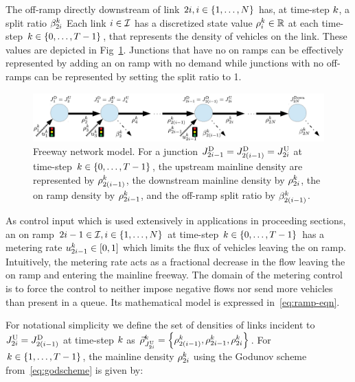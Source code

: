 The off-ramp directly downstream of link $2\link,i\in\intrange 1{\nlinks}$
has, at time-step $k$, a split ratio $\beta_{2i}^{k}$
Each link $i\in\mathcal{I}$ has a discretized state value $\rho_{i}^{k}\in\mathbb{R}$
at each time-step $\tind\in\intrange 0{\ntime-1}$, that represents
the density of vehicles on the link. These values are depicted in
Fig~\ref{fig:Freeway-network-junction}. Junctions that have no
on ramps can be effectively represented by adding an on ramp with no
demand while junctions with no off-ramps can be represented by setting
the split ratio to 1.
\begin{figure}
\centering
\includegraphics[width=1\columnwidth]{previous-articles/adjoint/figs-gen/rm-junction-2}
\caption{Freeway network model. For a junction $\jdown{2\link-1}=\jdown{2\left(\link-1\right)}=\jup{2\link}$
at time-step $\tind\in\intrange 0{\ntime-1}$, the upstream mainline
density are represented by $\densitydiscrete{2\left(\link-1\right)}{\tind}$,
the downstream mainline density by $\rho_{2i}^{k}$,
the on ramp density by $\rho_{2i-1}^{k}$, and the
off-ramp split ratio by $\splitratio_{2\left(\link-1\right)}^{\tind}$.}
\label{fig:Freeway-network-junction}
\end{figure}

As control input which is used extensively in applications in proceeding sections, an on ramp $2\link-1\in\links,\link\in\intrange 1{\nlinks}$
at time-step $k\in\intrange 0{\ntime-1}$ has a metering rate $\ramp_{2\link-1}^{\tind}\in\left[0,1\right]$
which limits the flux of vehicles leaving the on ramp. Intuitively,
the metering rate acts as a fractional decrease in the flow leaving
the on ramp and entering the mainline freeway. The domain of the metering
control is to force the control to neither impose negative flows nor
send more vehicles than present in a queue. Its mathematical model
is expressed in~\eqref{eq:ramp-eqn}.

For notational simplicity we define the set of densities of links
incident to $\jup{2\link}=\jdown{2\left(\link-1\right)}$ at time-step
$k$ as $\juncstate{\jup{2\link}}{\tind}=\left\{ \discrete{2\left(\link-1\right)}{\tind},\discrete{2i-1}{\tind},\discrete{2\link}{\tind}\right\} $. For $k\in\intrange 1{\ntime-1}$,
the mainline density $\rho_{2i}^{k}$ using the Godunov
scheme from~\eqref{eq:godscheme} is given by:

